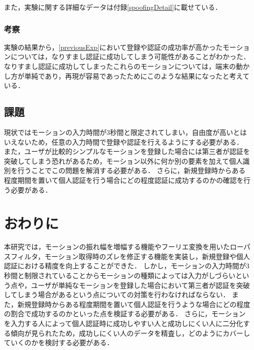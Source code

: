 \documentclass[12pt]{jreport}
\begin{document}
    また，実験に関する詳細なデータは付録\ref{spoofingDetail}に載せている．

    \subsection{考察}
    実験の結果から，\ref{previousExp}において登録や認証の成功率が高かったモーションについては，なりすまし認証に成功してしまう可能性があることがわかった．
    なりすまし認証に成功してしまったこれらのモーションについては，端末の動かし方が単純であり，再現が容易であったためにこのような結果になったと考えている．

    \section{課題} %
    現状ではモーションの入力時間が3秒間と限定されてしまい，自由度が高いとはいえないため，任意の入力時間で登録や認証を行えるようにする必要がある．
    また，ユーザが比較的シンプルなモーションを登録した場合には第三者が認証を突破してしまう恐れがあるため，モーション以外に何か別の要素を加えて個人識別を行うことでこの問題を解消する必要がある．
    さらに，新規登録時からある程度期間を置いて個人認証を行う場合にどの程度認証に成功するのかの確認を行う必要がある．

\chapter{おわりに} %
本研究では，モーションの振れ幅を増幅する機能やフーリエ変換を用いたローパスフィルタ，モーション取得時のズレを修正する機能を実装し，新規登録や個人認証における精度を向上することができた．
しかし，モーションの入力時間が3秒間と制限されていることからモーションの種類によっては入力がしづらいという点や，ユーザが単純なモーションを登録した場合において第三者が認証を突破してしまう場合があるという点についての対策を行わなければならない．
また，新規登録時からある程度期間を置いて個人認証を行うような場合にどの程度の割合で成功するのかといった点を検証する必要がある．
さらに，モーションを入力する人によって個人認証時に成功しやすい人と成功しにくい人に二分化する傾向が見られたため，成功しにくい人のデータを精査し，どのようにカバーしていくのかを検討する必要がある．
\end{document}
